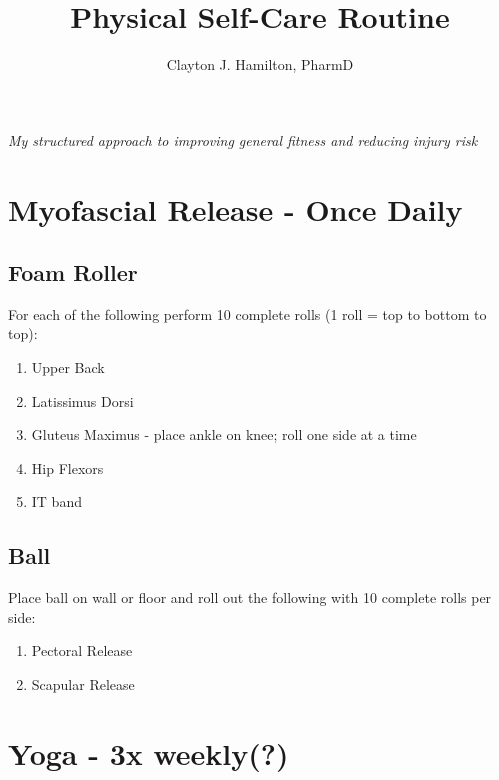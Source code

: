 \documentclass[12pt, letterpaper]{article}
\title{Physical Self-Care Routine}
\author{Clayton J. Hamilton, PharmD}
\date{}
\begin{document}

\maketitle

\centerline{\textit{My structured approach to improving general fitness and reducing injury risk}}

\tableofcontents

\newpage %


\section{Myofascial Release - Once Daily}

\subsection{Foam Roller}

For each of the following perform 10 complete rolls (1 roll = top to bottom to top):
\begin{enumerate}
    \item Upper Back
    \item Latissimus Dorsi
    \item Gluteus Maximus - place ankle on knee; roll one side at a time
    \item Hip Flexors
    \item IT band
\end{enumerate}

\subsection{Ball}
Place ball on wall or floor and roll out the following with 10 complete rolls per side:
\begin{enumerate}
    \item Pectoral Release
    \item Scapular Release
\end{enumerate}

\newpage %


\section{Yoga - 3x weekly(?)}
\end{document}
